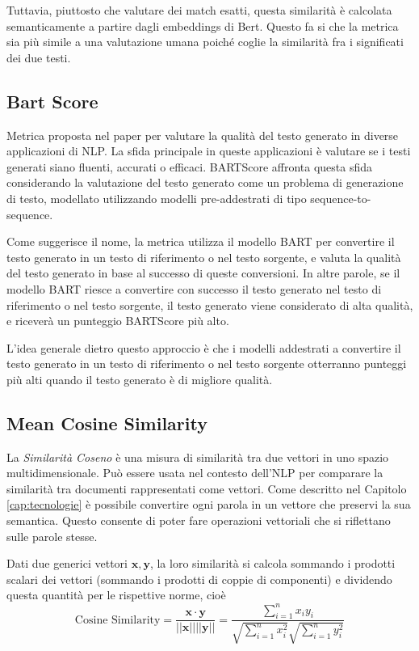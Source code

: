 \documentclass[12pt,a4paper,twoside,openright]{book}
\begin{document}
Tuttavia, piuttosto che valutare dei match esatti, questa similarità è calcolata semanticamente a partire dagli embeddings di Bert. Questo fa si che la metrica sia più simile a una valutazione umana poiché coglie la similarità fra i significati dei due testi.

\subsection{Bart Score}
Metrica proposta nel paper \cite{yuan2021bartscore} per valutare la qualità del testo generato in diverse applicazioni di NLP. La sfida principale in queste applicazioni è valutare se i testi generati siano fluenti, accurati o efficaci. BARTScore affronta questa sfida considerando la valutazione del testo generato come un problema di generazione di testo, modellato utilizzando modelli pre-addestrati di tipo sequence-to-sequence.

Come suggerisce il nome, la metrica utilizza il modello BART per convertire il testo generato in un testo di riferimento o nel testo sorgente, e valuta la qualità del testo generato in base al successo di queste conversioni. In altre parole, se il modello BART riesce a convertire con successo il testo generato nel testo di riferimento o nel testo sorgente, il testo generato viene considerato di alta qualità, e riceverà un punteggio BARTScore più alto.

L'idea generale dietro questo approccio è che i modelli addestrati a convertire il testo generato in un testo di riferimento o nel testo sorgente otterranno punteggi più alti quando il testo generato è di migliore qualità.


\subsection{Mean Cosine Similarity}
La \emph{Similarità Coseno} è una misura di similarità tra due vettori in uno spazio multidimensionale. Può essere usata nel contesto dell'NLP per comparare la similarità tra documenti rappresentati come vettori. 
Come descritto nel Capitolo \ref{cap:tecnologie} è possibile convertire ogni parola in un vettore che preservi la sua semantica. Questo consente di poter fare operazioni vettoriali che si riflettano sulle parole stesse. 

Dati due generici vettori $\mathbf{x}, \mathbf{y}$, la loro similarità si calcola sommando i prodotti scalari dei vettori (sommando i prodotti di coppie di componenti) e dividendo questa quantità per le rispettive norme, cioè
\begin{equation}
    \label{eq:cossim}
    \text{Cosine Similarity} = \frac{\mathbf{x \cdot y}}{\vert \vert \mathbf{x} \vert \vert \vert \vert \mathbf{y} \vert \vert} = 
    \frac{\sum_{i=1}^n x_i y_i}{\sqrt{\sum_{i=1}^n x_i^2} \sqrt{\sum_{i=1}^n y_i^2}}
\end{equation}
\end{document}
